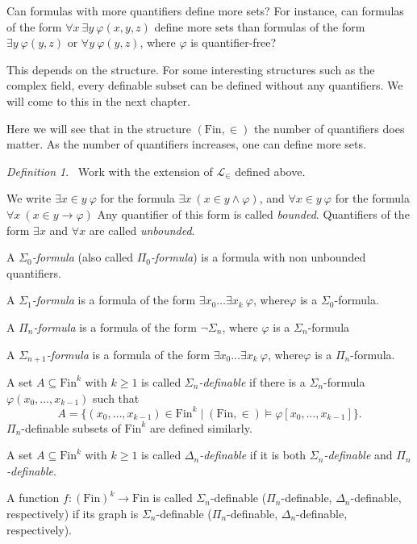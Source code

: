 \documentclass[a4paper, 11pt]{amsart}
\theoremstyle{remark}
\newtheorem{definition}[definition]{Definition}
\newcommand{\Fin}{\mathrm{Fin}}
\newcommand{\cL}{\mathcal L}
\newenvironment{enumerate-(1)}{\begin{enumerate}[label={\upshape (\arabic*)}, leftmargin=2pc]}{\end{enumerate}}
\begin{document}
Can formulas with more quantifiers define more sets? 
For instance, can formulas of the form $\forall x\ \exists y\ \varphi(x,y,z)$ define more sets than formulas of the form $\exists y\ \varphi(y,z)$ or $\forall y\ \varphi(y,z)$, where $\varphi$ is quantifier-free? 

This depends on the structure. For some interesting structures such as the complex field, every definable subset can be defined without any quantifiers. 
We will come to this in the next chapter. 

Here we will see that in the structure $(\Fin,\in)$ the number of quantifiers does matter. 
As the number of quantifiers increases, one can define more sets. 



\begin{definition} \ 
Work with the extension of $\cL_\in$ defined above. 
\begin{enumerate-(1)} 
\item 
We write $\exists x\in y\ \varphi$ for the formula $\exists x\ (x\in y \wedge \varphi)$, and 
$\forall x\in y\ \varphi$ for the formula $\forall x\ (x\in y \rightarrow \varphi)$
Any quantifier of this form is called \emph{bounded}. 
Quantifiers of the form $\exists x$ and $\forall x$ are called \emph{unbounded}. 
\item 
A \emph{$\Sigma_0$-formula} (also called \emph{$\Pi_0$-formula}) is a formula with non unbounded quantifiers. 
\item 
A  \emph{$\Sigma_1$-formula} is a formula of the form $\exists x_0 \dots \exists x_k\ \varphi$, 
where$\varphi$ is a $\Sigma_0$-formula. 
\item 
A  \emph{$\Pi_n$-formula} is a formula of the form $\neg \Sigma_n$, 
where $\varphi$ is a $\Sigma_n$-formula 
\item 
A  \emph{$\Sigma_{n+1}$-formula} is a formula of the form $\exists x_0 \dots \exists x_k\ \varphi$, 
where$\varphi$ is a $\Pi_n$-formula. 
\item 
A set $A\subseteq \Fin^k$ with $k\geq1$ is called \emph{$\Sigma_n$-definable} if there is a $\Sigma_n$-formula $\varphi(x_0,\dots,x_{k-1})$ such that  
$$ A = \{ (x_0,\dots,x_{k-1})\in \Fin^k \mid (\Fin,\in) \models \varphi[x_0,\dots,x_{k-1}] \}.$$ 
$\Pi_n$-definable subsets of $\Fin^k$ are defined similarly. 
\item 
A set $A\subseteq \Fin^k$ with $k\geq1$ is called \emph{$\Delta_n$-definable} if it is both  \emph{$\Sigma_n$-definable} and \emph{$\Pi_n$-definable}. 
\item 
A function $f\colon (\Fin)^k \rightarrow \Fin$ is called $\Sigma_n$-definable ($\Pi_n$-definable, $\Delta_n$-definable, respectively) if its graph is $\Sigma_n$-definable ($\Pi_n$-definable, $\Delta_n$-definable, respectively). 
\end{enumerate-(1)} 
\end{definition} 
\end{document}
